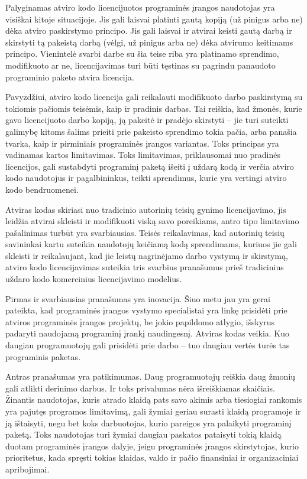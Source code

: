 Palyginamas atviro kodo licencijuotos programinės įrangos naudotojas yra visiškai kitoje situacijoje.
Jis gali laisvai platinti gautą kopiją (už pinigus arba ne) dėka atviro paskirstymo principo.
Jis gali laisvai ir atvirai keisti gautą darbą ir skirstyti tą pakeistą darbą (vėlgi, už pinigus arba ne) dėka atvirumo keitimams principo.
Vienintelė svarbi darbe su šia teise riba yra platinamo sprendimo, modifikuoto ar ne, licencijavimas turi būti tęstinas su pagrindu panaudoto programinio paketo atvira licencija.

Pavyzdžiui, atviro kodo licencija gali reikalauti modifikuoto darbo paskirstymą su tokiomis pačiomis teisėmis, kaip ir pradinis darbas.
Tai reiškia, kad žmonės, kurie gavo licencijuoto darbo kopiją, ją pakeitė ir pradėjo skirstyti -- jie turi suteikti galimybę kitoms šalims prieiti prie pakeisto sprendimo tokia pačia, arba panašia tvarka, kaip ir pirminiais programinės įrangos variantas.
Toks principas yra vadinamas kartos limitavimas.
Toks limitavimas, priklausomai nuo pradinės licencijos, gali sustabdyti programinį paketą išeiti į uždarą kodą ir verčia atviro kodo naudotojus ir pagalbininkus, teikti sprendimus, kurie yra vertingi atviro kodo bendruomenei.

Atviras kodas skiriasi nuo tradicinio autorinių teisių gynimo licencijavimo, jis leidžia atvirai skleisti ir modifikuoti viską savo poreikiams, antro tipo limitavimo pašalinimas turbūt yra svarbiausias.
Teisės reikalavimas, kad autorinių teisių savininkai kartu suteikia naudotojų keičiamą kodą sprendimams, kuriuos jie gali skleisti ir reikalaujant, kad jie leistų nagrinėjamo darbo vystymą ir skirstymą, atviro kodo licencijavimas suteikia tris svarbius pranašumus prieš tradicinius uždaro kodo komercinius licencijavimo modelius.

Pirmas ir svarbiausias pranašumas yra inovacija.
Šiuo metu jau yra gerai pateikta, kad programinės įrangos vystymo specialistai yra linkę prisidėti prie atviros programinės įrangos projektų, be jokio papildomo atlygio, išskyrus padaryti naudojamą programinį įrankį naudingesnį.
Atviras kodas veikia.
Kuo daugiau programuotojų gali prisidėti prie darbo -- tuo daugiau vertės turės tas programinis paketas.

Antras pranašumas yra patikimumas. 
Daug programuotojų reiškia daug žmonių gali atlikti derinimo darbus.
Ir toks privalumas nėra išreiškiamas skaičiais.
Žinantis naudotojas, kuris atrado klaidą pats savo akimis arba tiesiogiai rankomis yra pajutęs programos limitavimą, gali žymiai geriau surasti klaidą programoje ir ją ištaisyti, negu bet koks darbuotojas, kurio pareigos yra palaikyti programinį paketą.
Toks naudotojas turi žymiai daugiau paskatos pataisyti tokią klaidą duotam programinės įrangos dalyje, jeigu programinės įrangos skirstytojas, kurio prioritetus, kada spręsti tokias klaidas, valdo ir pačio finansiniai ir organizaciniai apribojimai.

